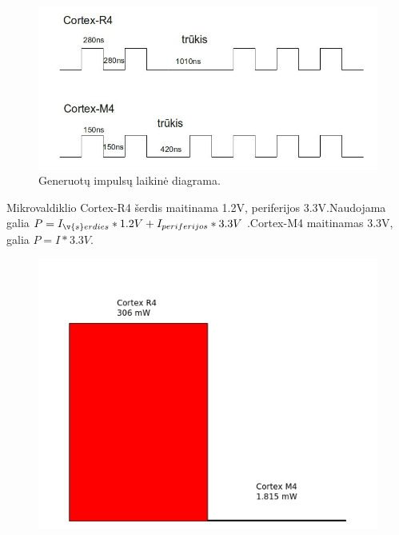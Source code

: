 \documentclass[a4paper, 12pt]{article} %
\begin{document}
\begin{onehalfspacing}
\begin{figure}[H]
\centering %
\includegraphics[scale=0.4]{pav/trukiai.jpg} %
\captionsetup{labelformat=numbfirst} %
\captionsetup{labelseparator=tarpas}
\caption{Generuot\k{u} impuls\k{u} laikin\.e diagrama.}
\label{vienas}
\end{figure}
Mikrovaldiklio Cortex-R4 \v{s}erdis maitinama 1.2V, periferijos 3.3V.Naudojama galia $P=I_{\v{s}erdies} *1.2V + I_{periferijos} * 3.3V$  .Cortex-M4 maitinamas 3.3V, galia $P=I*3.3V$.
\begin{figure}[H] %
\centering %
\includegraphics[scale=0.8]{pav/modes.jpg} %
\captionsetup{labelformat=numbfirst} %

\end{figure}
\end{onehalfspacing}
\end{document}

